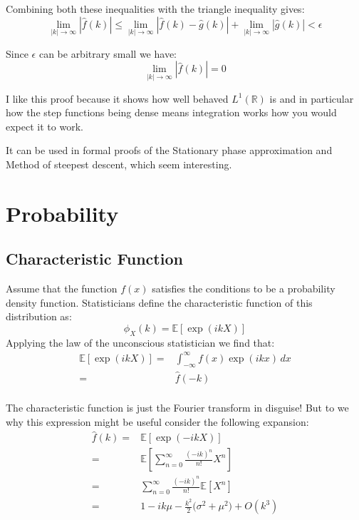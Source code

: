 Combining both these inequalities with the triangle inequality gives:
\[\lim_{|k|\rightarrow \infty}|\hat{f}(k)| \leq \lim_{|k|\rightarrow \infty}|\hat{f}(k)-\hat{g}(k)| + \lim_{|k|\rightarrow \infty}|\hat{g}(k)| < \epsilon\]

Since $\epsilon$ can be arbitrary small we have:
\[\lim_{|k|\rightarrow \infty}|\hat{f}(k)| = 0\]

I like this proof because it shows how well behaved $L^1(\mathbb{R})$ is and in particular how the step functions being dense means integration works how you would expect it to work.

It can be used in formal proofs of the Stationary phase approximation and Method of steepest descent, which seem interesting.

\section{Probability}
\subsection{Characteristic Function}

Assume that the function $f(x)$ satisfies the conditions to be a probability density function.
Statisticians define the characteristic function of this distribution as:
\[\phi_X(k) = \mathbb{E}[\exp(ikX)]\]
Applying the law of the unconscious statistician we find that:
\begin{equation*}
\begin{aligned}
\mathbb{E}[\exp(ikX)] =& \int_{-\infty}^{\infty}f(x)\exp(ikx)\,dx\\
=& \hat{f}(-k)\\
\end{aligned}
\end{equation*}

The characteristic function is just the Fourier transform in disguise!
But to we why this expression might be useful consider the following expansion:
\begin{equation*}
\begin{aligned}
\hat{f}(k) =& \mathbb{E}[\exp(-ikX)]\\
=& \mathbb{E}\left[\sum_{n=0}^\infty\frac{(-ik)^n}{n!}X^n\right]\\
=& \sum_{n=0}^\infty\frac{(-ik)^n}{n!}\mathbb{E}\left[X^n\right]\\
=&1-ik\mu-\frac{k^2}{2}\big(\sigma^2+\mu^2\big) + O(k^3)\\
\end{aligned}
\end{equation*}

